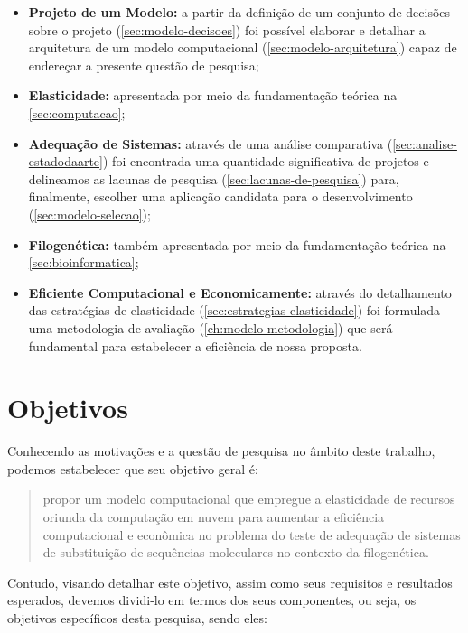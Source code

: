 \documentclass[english,brazilian]{UNISINOSmonografia} %
\begin{document}
\begin{itemize}
	
	\item \textbf{Projeto de um Modelo:} a partir da definição de um conjunto de decisões sobre o projeto (\autoref{sec:modelo-decisoes}) foi possível elaborar e detalhar a arquitetura de um modelo computacional (\autoref{sec:modelo-arquitetura}) capaz de endereçar a presente questão de pesquisa;
	
	\item \textbf{Elasticidade:} apresentada por meio da fundamentação teórica na \autoref{sec:computacao};
	
	\item \textbf{Adequação de Sistemas:} através de uma análise comparativa (\autoref{sec:analise-estadodaarte}) foi encontrada uma quantidade significativa de projetos e delineamos as lacunas de pesquisa (\autoref{sec:lacunas-de-pesquisa}) para, finalmente, escolher uma aplicação candidata para o desenvolvimento (\autoref{sec:modelo-selecao});
	
	\item \textbf{Filogenética:} também apresentada por meio da fundamentação teórica na \autoref{sec:bioinformatica};
	
	\item \textbf{Eficiente Computacional e Economicamente:} através do detalhamento das estratégias de elasticidade (\autoref{sec:estrategias-elasticidade}) foi formulada uma metodologia de avaliação (\autoref{ch:modelo-metodologia}) que será fundamental para estabelecer a eficiência de nossa proposta.
\end{itemize}



\section{Objetivos}
\label{sec:objetivos}



Conhecendo as motivações e a questão de pesquisa no âmbito deste trabalho, podemos estabelecer que seu objetivo geral é:
\begin{quote}
	\large
	propor um modelo computacional que empregue a elasticidade de recursos oriunda da computação em nuvem para aumentar a eficiência computacional e econômica no problema do teste de adequação de sistemas de substituição de sequências moleculares no contexto da filogenética.
\end{quote}
Contudo, visando detalhar este objetivo, assim como seus requisitos e resultados esperados, devemos dividi-lo em termos dos seus componentes, ou seja, os objetivos específicos desta pesquisa, sendo eles:
\end{document}
